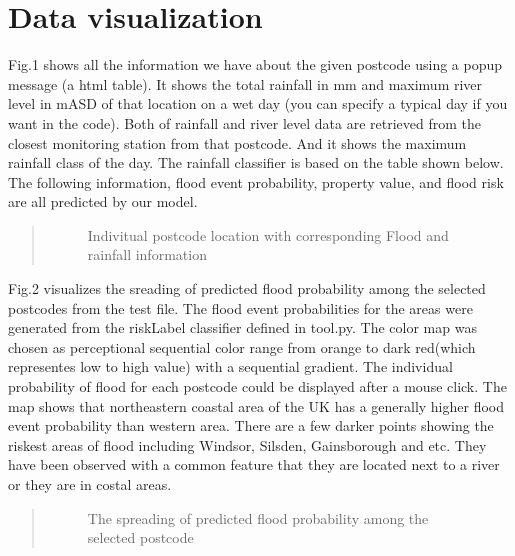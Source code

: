 \documentclass[letterpaper,10pt,english]{sphinxmanual}
\let\sphinxpxdimen\pdfpxdimen\else\newdimen\sphinxpxdimen
\begin{document}
\chapter{Data visualization}
\label{\detokenize{index:data-visualization}}
\sphinxAtStartPar
Fig.1 shows all the information we have about the given postcode using a popup message (a html table). It shows the total rainfall in mm and maximum river level in mASD of that location on a wet day (you can specify a typical day if you want in the code). Both of rainfall and river level data are retrieved from the closest monitoring station from that postcode. And it shows the maximum rainfall class of the day. The rainfall classifier is based on the table shown below. The following information, flood event probability, property value, and flood risk are all predicted by our model.
\begin{quote}

\begin{figure}[htbp]
\centering
\capstart

\noindent\sphinxincludegraphics[width=500\sphinxpxdimen]{{pic1}.png}
\caption{Indivitual postcode location with corresponding Flood and rainfall information}\label{\detokenize{index:id7}}\end{figure}
\end{quote}

\sphinxAtStartPar
Fig.2 visualizes the sreading of predicted flood probability among the selected postcodes from the test file. The flood event probabilities for the areas were generated from the riskLabel classifier defined in tool.py. The color map was chosen as perceptional sequential color range from orange to dark red(which representes low to high value) with a sequential gradient. The individual probability of flood for each postcode could be displayed after a mouse click. The map shows that north\sphinxhyphen{}eastern coastal area of the UK has a generally higher flood event probability than western area. There are a few darker points showing the riskest areas of flood including Windsor, Silsden, Gainsborough and etc. They have been observed with a common feature that they are located next to a river or they are in costal areas.
\begin{quote}

\begin{figure}[htbp]
\centering
\capstart

\noindent\sphinxincludegraphics[width=500\sphinxpxdimen]{{pic2}.png}
\caption{The spreading of predicted flood probability among the selected postcode}\label{\detokenize{index:id8}}\end{figure}
\end{quote}
\end{document}
